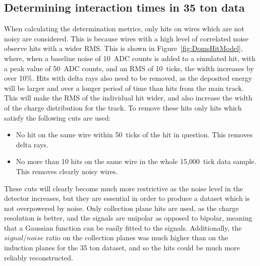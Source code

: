 \subsection{Determining interaction times in 35 ton data}
When calculating the determination metrics, only hits on wires which are not noisy are considered. This is because wires with a high level of correlated noise observe hits with a wider RMS. This is shown in Figure~\ref{fig:DomsHitModel}, where, when a baseline noise of 10~ADC counts is added to a simulated hit, with a peak value of 50~ADC counts, and an RMS of 10~ticks, the width increases by over 10\%. Hits with delta rays also need to be removed, as the deposited energy will be larger and over a longer period of time than hits from the main track. This will make the RMS of the individual hit wider, and also increase the width of the charge distribution for the track. To remove these hits only hits which satisfy the following cuts are used:
\begin{itemize}
\item No hit on the same wire within 50~ticks of the hit in question. This removes delta rays.
\item No more than 10 hits on the same wire in the whole 15,000~tick data sample. This removes clearly noisy wires.
\end{itemize}
These cuts will clearly become much more restrictive as the noise level in the detector increases, but they are essential in order to produce a dataset which is not overpowered by noise. Only collection plane hits are used, as the charge resolution is better, and the signals are unipolar as opposed to bipolar, meaning that a Gaussian function can be easily fitted to the signals. Additionally, the $signal/noise$ ratio on the collection planes was much higher than on the induction planes for the 35 ton dataset, and so the hits could be much more reliably reconstructed. \\

